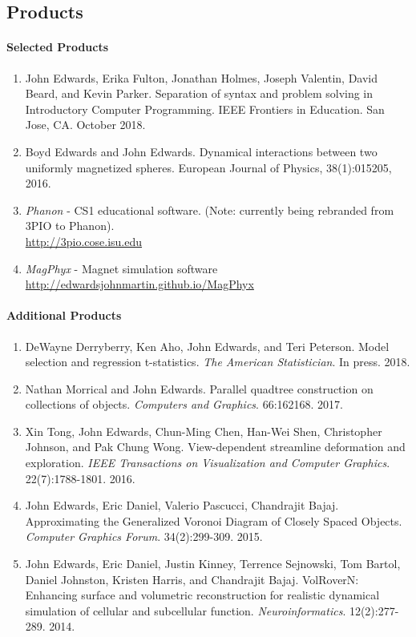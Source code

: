 \documentclass[svgnames,12pt]{article}
\newenvironment{tightenumerate}{
\begin{enumerate}
  \setlength{\itemsep}{1pt}
  \setlength{\parskip}{0pt}
  \setlength{\parsep}{0pt}
}{\end{enumerate}
}
\begin{document}
\subsection*{Products}
\paragraph{Selected Products}
\begin{tightenumerate}
\item John Edwards, Erika Fulton, Jonathan Holmes, Joseph Valentin, David Beard, and Kevin Parker. Separation of syntax and problem solving in Introductory Computer Programming. IEEE Frontiers in Education. San Jose, CA. October 2018.
\item Boyd Edwards and John Edwards. Dynamical interactions between two uniformly magnetized spheres. European Journal of Physics, 38(1):015205, 2016.
\item \emph{Phanon} - CS1 educational software. (Note: currently being rebranded from 3PIO to Phanon).\\
\url{http://3pio.cose.isu.edu}
\item \emph{MagPhyx} - Magnet simulation software\\
\url{http://edwardsjohnmartin.github.io/MagPhyx}
\end{tightenumerate}

\newpage

\paragraph{Additional Products}
\begin{tightenumerate}
\item DeWayne Derryberry, Ken Aho, John Edwards, and Teri Peterson. Model selection and regression t-statistics. \textit{The American Statistician}. In press. 2018.
\item Nathan Morrical and John Edwards. Parallel quadtree construction on collections of objects. \textit{Computers and Graphics}. 66:162168. 2017.
\item Xin Tong, John Edwards, Chun-Ming Chen, Han-Wei Shen, Christopher Johnson, and Pak Chung Wong. View-dependent streamline deformation and exploration. \textit{IEEE Transactions on Visualization and Computer Graphics}. 22(7):1788-1801. 2016.
\item John Edwards, Eric Daniel, Valerio Pascucci, Chandrajit Bajaj. Approximating the Generalized Voronoi Diagram of Closely Spaced Objects. \textit{Computer Graphics Forum}. 34(2):299-309. 2015.
\item John Edwards, Eric Daniel, Justin Kinney, Terrence Sejnowski, Tom Bartol, Daniel Johnston, Kristen Harris, and Chandrajit Bajaj. VolRoverN: Enhancing surface and volumetric reconstruction for realistic dynamical simulation of cellular and subcellular function.  \textit{Neuroinformatics}. 12(2):277-289.  2014.
\end{tightenumerate}
\end{document}
